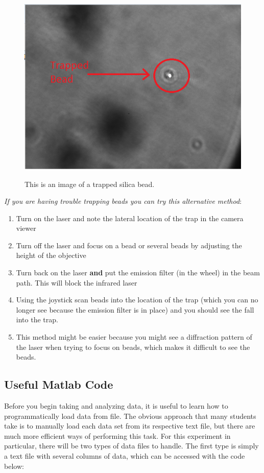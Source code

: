 \documentclass{../lab}
\begin{document}
\begin{figure}[h]
    \centering
    \href{http://experimentationlab.berkeley.edu/sites/default/files/OTZ/trapped.png}{\includegraphics[width=0.5\linewidth]{images/trapped.png}}
    \caption{This is an image of a trapped silica bead.}
    \label{fig:trapped}
\end{figure}

\emph{If you are having trouble trapping beads you can try this alternative method}:

\begin{enumerate}
    \item Turn on the laser and note the lateral location of the trap in the camera viewer

    \item Turn off the laser and focus on a bead or several beads by adjusting the height of the objective

    \item Turn back on the laser \textbf{and} put the emission filter (in the wheel) in the beam path. This will block the infrared laser

    \item Using the joystick scan beads into the location of the trap (which you can no longer see because the emission filter is in place) and you should see the fall into the trap.

    \item This method might be easier because you might see a diffraction pattern of the laser when trying to focus on beads, which makes it difficult to see the beads.
\end{enumerate}

\subsection{Useful Matlab Code}

Before you begin taking and analyzing data, it is useful to learn how to programmatically load data from file. The obvious approach that many students take is to manually load each data set from its respective text file, but there are much more efficient ways of performing this task. For this experiment in particular, there will be two types of data files to handle. The first type is simply a text file with several columns of data, which can be accessed with the code below:
\end{document}
